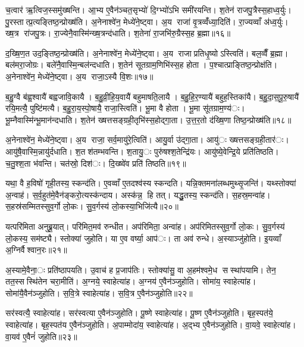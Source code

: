 च॒त्वार॑ ऋ॒त्विज॒स्समु॑ख्षन्ति। आ॒भ्य ए॒वैन॑ञ्चत॒सृभ्यो॑ दि॒ग्भ्यो॑ऽभि समी॑रयन्ति। श॒तेन॑ राजपु॒त्रैस्स॒हाध्व॒र्युः। पु॒रस्तात्प्र॒त्यङ्तिष्ठ॒न्प्रोख्ष॑ति। अ॒नेनाश्वे॑न॒ मेध्ये॑ने॒ष्ट्वा। अ॒य राजा॑ वृ॒त्रव्वँ॑ध्या॒दिति॑। रा॒ज्यव्वाँ अ॑ध्व॒र्युः। ख्ष॒त्र रा॑जपु॒त्रः। रा॒ज्येनै॒वास्मि॑न्ख्ष॒त्रन्द॑धाति। श॒तेना॑ रा॒जभि॑रु॒ग्रैस्स॒ह ब्र॒ह्मा॥१६॥

द॒ख्षि॒ण॒त उद॒ङ्तिष्ठ॒न्प्रोख्ष॑ति। अ॒नेनाश्वे॑न॒ मेध्ये॑ने॒ष्ट्वा। अ॒य राजाप्रतिधृ॒ष्योऽस्त्विति॑। बल॒व्वैँ ब्र॒ह्मा। बल॑मरा॒जोग्रः। बले॑नै॒वास्मि॒न्बल॑न्दधाति। श॒तेन॑ सूतग्राम॒णिभि॑स्स॒ह होता। प॒श्चात्प्राङ्तिष्ठ॒न्प्रोक्ष॑ति। अ॒नेनाश्वे॑न॒ मेध्ये॑ने॒ष्ट्वा। अ॒य राजा॒ऽस्यै वि॒शः॥१७॥

ब॒हु॒ग्वै ब॑ह्व॒श्वायै॑ बह्वजावि॒कायै। ब॒हु॒व्री॒हि॒य॒वायै॑ बहुमाषति॒लायै। ब॒हु॒हि॒र॒ण्यायै॑ बहुह॒स्तिका॑यै। ब॒हु॒दा॒स॒पू॒रु॒षायै॑ रयि॒मत्यै॒ पुष्टि॑मत्यै। ब॒हु॒रा॒य॒स्पो॒षायै॒ राजा॒स्त्विति॑। भू॒मा वै होता। भू॒मा सू॑तग्राम॒ण्य॑ः। भू॒म्नैवास्मि॑न्भू॒मान॑न्दधाति। श॒तेन॑ ख्षत्तसङ्ग्रही॒तृभि॑स्स॒होद्गा॒ता। उ॒त्त॒र॒तो द॑ख्षि॒णा तिष्ठ॒न्प्रोख्ष॑ति॥१८॥

अ॒नेनाश्वे॑न॒ मेध्ये॑ने॒ष्ट्वा। अ॒य राजा॒ सर्व॒मायु॑रे॒त्विति॑। आयु॒र्वा उ॑द्गा॒ता। आयु॑ः ख्षत्तसङ्ग्रही॒तार॑ः। आयु॑षै॒वास्मि॒न्नायु॑र्दधाति। श॒तश॑तम्भवन्ति। श॒तायु॒ः पुरु॑षश्श॒तेन्द्रि॑यः। आयु॑ष्ये॒वेन्द्रि॒ये प्रति॑तिष्ठति। च॒तु॒श्श॒ता भ॑वन्ति। चत॑स्रो॒ दिश॑ः। दि॒ख्ष्वे॑व प्रति॑ तिष्ठति॥१९॥


यथा॒ वै ह॒विषो॑ गृही॒तस्य॒ स्कन्द॑ति। ए॒वव्वाँ ए॒तदश्व॑स्य स्कन्दति। यन्नि॒क्तमना॑लब्धमुथ्सृ॒जन्ति॑। यथ्स्तोक्या॑ अ॒न्वाह॑। स॒र्व॒हुत॑मे॒वैन॑ङ्करो॒त्यस्क॑न्दाय। अस्क॑न्न॒ हि तत्। यद्धु॒तस्य॒ स्कन्द॑ति। स॒हस्र॒मन्वा॑ह। स॒हस्र॑सम्मितस्सुव॒र्गो लो॒कः। सु॒व॒र्गस्य॑ लो॒कस्या॒भिजि॑त्यै॥२०॥

यत्परि॑मिता अनुब्रू॒यात्। परि॑मित॒मव॑ रुन्धीत। अप॑रिमिता॒ अन्वा॑ह। अप॑रिमितस्सुव॒र्गो लो॒कः। सु॒व॒र्गस्य॑ लो॒कस्य॒ सम॑ष्ट्यै। स्तोक्या॑ जुहोति। या ए॒व वर्ष्या॒ आप॑ः। ता अव॑ रुन्धे। अ॒स्याञ्जु॑होति। इ॒यव्वाँ अ॒ग्निर्वैश्वान॒रः॥२१॥

अ॒स्यामे॒वैना॒ः प्रति॑ष्ठापयति। उ॒वाच॑ ह प्र॒जाप॑तिः। स्तोक्या॑सु॒ वा अ॒हम॑श्वमे॒ध सस्था॑पयामि। तेन॒ तत॒स्सस्थि॑तेन चरा॒मीति॑। अ॒ग्नये॒ स्वाहेत्या॑ह। अ॒ग्नय॑ ए॒वैन॑ञ्जुहोति। सोमा॑य॒ स्वाहेत्या॑ह। सोमा॑यै॒वैन॑ञ्जुहोति। स॒वि॒त्रे स्वाहेत्या॑ह। स॒वि॒त्र ए॒वैन॑ञ्जुहोति॥२२॥

सर॑स्वत्यै॒ स्वाहेत्या॑ह। सर॑स्वत्या ए॒वैन॑ञ्जुहोति। पू॒ष्णे स्वाहेत्या॑ह। पू॒ष्ण ए॒वैन॑ञ्जुहोति। बृह॒स्पत॑ये॒ स्वाहेत्या॑ह। बृह॒स्पत॑य ए॒वैन॑ञ्जुहोति। अ॒पाम्मोदा॑य॒ स्वाहेत्या॑ह। अ॒द्भ्य ए॒वैन॑ञ्जुहोति। वा॒यवे॒ स्वाहेत्या॑ह। वा॒यव॑ ए॒वैनं॑ जुहोति॥२३॥

